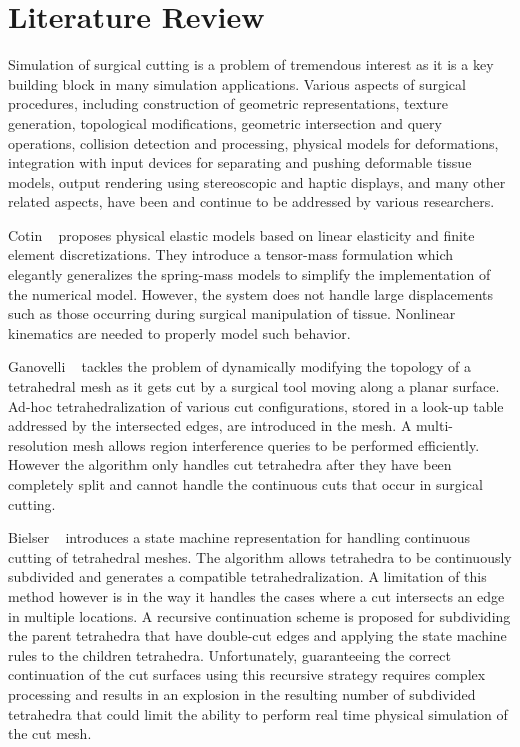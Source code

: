 
\chapter{Literature Review}\label{chp:literature}

Simulation of surgical cutting is a problem of tremendous interest as it is a key building block in many simulation applications. Various aspects of surgical procedures, including construction of geometric representations, texture generation, topological modifications, geometric intersection and query operations, collision detection and processing, physical models for deformations, integration with input devices for separating and pushing deformable tissue models, output rendering using  stereoscopic and haptic displays, and many other related aspects, have been and continue to be addressed by various researchers.

Cotin \etal~\cite{cotin:tvc:2000} proposes physical elastic models based on linear elasticity and finite element discretizations. They introduce a tensor-mass formulation which elegantly generalizes the spring-mass models to simplify the implementation of the numerical model. However, the system does not handle large displacements such as those occurring during surgical manipulation of tissue. Nonlinear kinematics are needed to properly model such behavior.

Ganovelli \etal~\cite{ganovelli:tvc:2001} tackles the problem of dynamically modifying the topology of a  tetrahedral mesh as it gets cut by a surgical tool moving along a planar surface. Ad-hoc tetrahedralization of various cut configurations, stored in a look-up table addressed by the intersected edges, are introduced in the mesh. A multi-resolution mesh allows region interference queries to be performed efficiently. However the algorithm only handles cut tetrahedra after they have been completely split and cannot handle the continuous cuts that occur in surgical cutting.

Bielser \etal~\cite{bielser:gm:2004} introduces a state machine representation for handling continuous cutting of tetrahedral meshes. The algorithm allows tetrahedra to be continuously subdivided and generates a compatible tetrahedralization. A limitation of this method however is in the way it handles the cases where a cut intersects an edge in multiple locations. A recursive continuation scheme is proposed for subdividing the parent tetrahedra that have double-cut edges and applying the state machine rules to the children tetrahedra. Unfortunately, guaranteeing the correct continuation of the cut surfaces using this recursive strategy requires complex processing and results in an explosion in the resulting number of subdivided tetrahedra that could limit the ability to perform real time physical simulation of the cut mesh.

